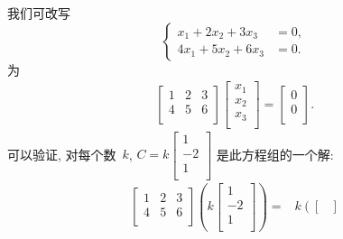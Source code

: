 \documentclass[../libro.tex]{subfiles}
\begin{document}
\begin{example}
    我们可改写
    \begin{equation*}
        \left\{ %
        \begin{aligned}
            x_1 + 2x_2 + 3x_3  & = 0, \\
            4x_1 + 5x_2 + 6x_3 & = 0.
        \end{aligned}
        \right. %
    \end{equation*}
    为
    \begin{align*}
        \begin{bmatrix}
            1 & 2 & 3 \\
            4 & 5 & 6 \\
        \end{bmatrix}
        \begin{bmatrix}
            x_1 \\
            x_2 \\
            x_3 \\
        \end{bmatrix}
        =
        \begin{bmatrix}
            0 \\
            0 \\
        \end{bmatrix}.
    \end{align*}
    可以验证, 对每个数~\(k\),
    \(
        C = k
        \begin{bmatrix}
            1  \\
            -2 \\
            1  \\
        \end{bmatrix}
    \)
    是此方程组的一个解:
    \begin{align*}
        \begin{bmatrix}
            1 & 2 & 3 \\
            4 & 5 & 6 \\
        \end{bmatrix}
        \left(
            k
            \begin{bmatrix}
                1  \\
                -2 \\
                1  \\
            \end{bmatrix}
        \right)
        = {} &
        k
        \left(
            \begin{bmatrix}

\end{bmatrix}
\end{align*}
\end{example}
\end{document}
